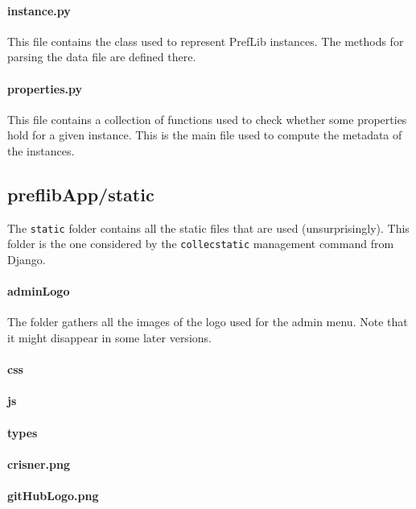 \documentclass{report}
\begin{document}
	\paragraph*{\faFileO{} instance.py} This file contains the class used to represent PrefLib instances. The methods for parsing the data file are defined there.
	
	\paragraph*{\faFileO{} properties.py} This file contains a collection of functions used to check whether some properties hold for a given instance. This is the main file used to compute the metadata of the instances.
	
	\subsection*{\faFolderO{} preflibApp/static}
	
	The \texttt{static} folder contains all the static files that are used (unsurprisingly). This folder is the one considered by the \texttt{collecstatic} management command from Django.
	
	\paragraph*{\faFolderO{} adminLogo} The folder gathers all the images of the logo used for the admin menu. Note that it might disappear in some later versions.
	
	\paragraph*{\faFolderO{} css}
	
	\paragraph*{\faFolderO{} js}
	
	\paragraph*{\faFolderO{} types}
	
	\paragraph*{\faFileO{} crisner.png}
	
	\paragraph*{\faFileO{} gitHubLogo.png}
	
\end{document}
